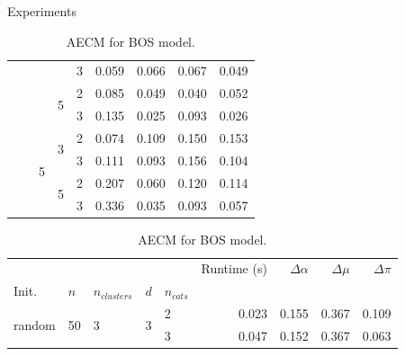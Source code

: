 \documentclass{beamer}
\begin{document}
\begin{frame}{Experiments}
\begin{table}[H]
\begin{minipage}{.48\columnwidth}
\begin{adjustbox}{width=\columnwidth}
\begin{tabular}{lllllrrrr}
                 &  &  &  & 3 & 0.059 & 0.066 & 0.067 & 0.049 \\
                \cline{4-9}
                 &  &  & \multirow[t]{2}{*}{5} & 2 & 0.085 & 0.049 & 0.040 & 0.052 \\
                 &  &  &  & 3 & 0.135 & 0.025 & 0.093 & 0.026 \\
                \cline{3-9} \cline{4-9}
                 &  & \multirow[t]{4}{*}{5} & \multirow[t]{2}{*}{3} & 2 & 0.074 & 0.109 & 0.150 & 0.153 \\
                 &  &  &  & 3 & 0.111 & 0.093 & 0.156 & 0.104 \\
                \cline{4-9}
                 &  &  & \multirow[t]{2}{*}{5} & 2 & 0.207 & 0.060 & 0.120 & 0.114 \\
                 &  &  &  & 3 & 0.336 & 0.035 & 0.093 & 0.057 \\
                \cline{1-9} \cline{2-9} \cline{3-9} \cline{4-9}
                \end{tabular}
            \end{adjustbox}
            \caption*{AECM for BOS model.}
            \label{tab:results_bos}
        \end{minipage} \hspace{.02\columnwidth}%
        \begin{minipage}{.48\columnwidth}
            \centering
            \begin{adjustbox}{width=\columnwidth}
                \begin{tabular}{lllllrrrr}
                 &  &  &  &  & Runtime (s) & $\Delta \alpha$ & $\Delta \mu$ & $\Delta \pi$ \\
                Init. & $n$ & $n_{clusters}$ & $d$ & $n_{cats}$ &  &  &  &  \\
                \cline{1-9} \cline{2-9} \cline{3-9} \cline{4-9}
                \multirow[t]{16}{*}{random} & \multirow[t]{8}{*}{50} & \multirow[t]{4}{*}{3} & \multirow[t]{2}{*}{3} & 2 & 0.023 & 0.155 & 0.367 & 0.109 \\
                 &  &  &  & 3 & 0.047 & 0.152 & 0.367 & 0.063 \\

\end{tabular}
\end{adjustbox}
\end{minipage}
\end{table}
\end{frame}
\end{document}
